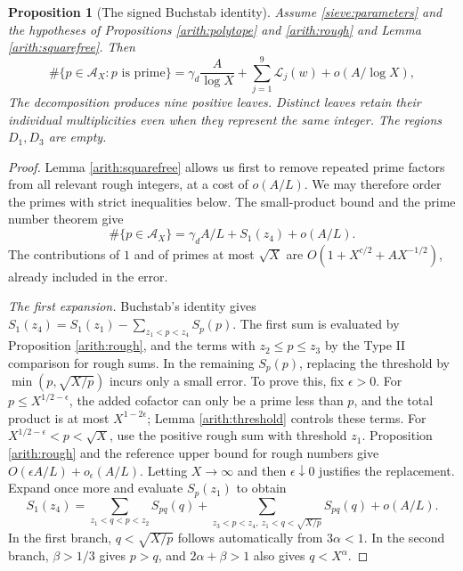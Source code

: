\documentclass[11pt,a4paper]{article}
\theoremstyle{paperplain}
\newtheorem{proposition}[theorem]{Proposition}
\numberwithin{equation}{section}
\begin{document}
\begin{proposition}[The signed Buchstab identity]\label{sieve:nine}
Assume \eqref{sieve:parameters} and the hypotheses of Propositions
\ref{arith:polytope} and \ref{arith:rough} and Lemma
\ref{arith:squarefree}. Then
\begin{equation}\label{sieve:signed}
 \#\{p\in\mathcal A_X:p\text{ is prime}\}
 =\gamma_d\frac A{\log X}+\sum_{j=1}^9\mathcal L_j(w)+o(A/\log X),
\end{equation}
The decomposition produces nine positive leaves.
Distinct leaves retain their individual multiplicities even when
they represent the same integer.
The regions $D_1,D_3$ are empty.
\end{proposition}
\begin{proof}
Lemma \ref{arith:squarefree} allows us first to remove repeated prime
factors from all relevant rough integers, at a cost of $o(A/L)$.
We may therefore order the primes with strict inequalities below.
The small-product bound and the prime number theorem give
\begin{equation}\label{sieve:prime-reference}
 \#\{p\in\mathcal A_X\}=\gamma_d A/L+S_1(z_4)+o(A/L).
\end{equation}
The contributions of $1$ and of primes at most $\sqrt X$ are
$O(1+X^{c/2}+AX^{-1/2})$, already included in the error.

\smallskip\noindent\emph{The first expansion.}\quad
Buchstab's identity gives
$S_1(z_4)=S_1(z_1)-\sum_{z_1<p<z_4}S_p(p)$.
The first sum is evaluated by Proposition \ref{arith:rough}, and the
terms with $z_2\le p\le z_3$ by the Type II comparison for rough sums.
In the remaining $S_p(p)$, replacing the threshold by
$\min(p,\sqrt{X/p})$ incurs only a small error.
To prove this, fix $\epsilon>0$.
For $p\le X^{1/2-\epsilon}$, the added cofactor can only be a prime
less than $p$, and the total product is at most $X^{1-2\epsilon}$;
Lemma \ref{arith:threshold} controls these terms.
For $X^{1/2-\epsilon}<p<\sqrt X$, use the positive rough sum with
threshold $z_1$.
Proposition \ref{arith:rough} and the reference upper bound for rough
numbers give $O(\epsilon A/L)+o_\epsilon(A/L)$.
Letting $X\to\infty$ and then $\epsilon\downarrow0$ justifies the
replacement.
Expand once more and evaluate $S_p(z_1)$ to obtain
\begin{equation}\label{sieve:two-branches}
 S_1(z_4)=
 \sum_{z_1<q<p<z_2}S_{pq}(q)
 +\sum_{z_3<p<z_4,\ z_1<q<\sqrt{X/p}}S_{pq}(q)+o(A/L).
\end{equation}
In the first branch, $q<\sqrt{X/p}$ follows automatically from
$3\alpha<1$.
In the second branch, $\beta>1/3$ gives $p>q$, and
$2\alpha+\beta>1$ also gives $q<X^\alpha$.


\end{proof}
\end{document}
